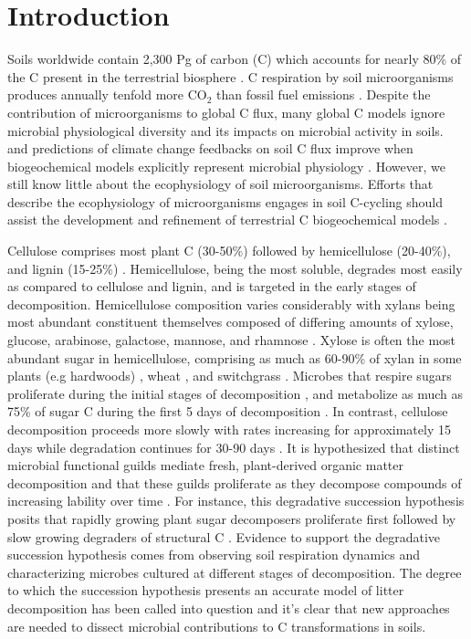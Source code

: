 \section{Introduction}
Soils worldwide contain 2,300 Pg of carbon (C) which accounts for nearly 80\%
of the C present in the terrestrial biosphere
\citep{Amundson_2001,BATJES_1996}. C respiration by soil microorganisms
produces annually tenfold more CO$_{2}$ than fossil fuel emissions
\citep{chapin2002principles}. Despite the contribution of microorganisms to
global C flux, many global C models ignore microbial
physiological diversity and its impacts on microbial activity in soils.
\citep{Allison2010,Six2006,Treseder2011} and predictions of climate change
feedbacks on soil C flux improve when biogeochemical models explicitly
represent microbial physiology \citep{Wieder2013}. However, we still know
little about the ecophysiology of soil microorganisms. Efforts that describe
the ecophysiology of microorganisms engages in soil C-cycling 
should assist the development and refinement of terrestrial
C biogeochemical models \citep{Bradford2008,Neff_2001,McGuire2010}.

Cellulose comprises most plant C (30-50\%) followed by hemicellulose (20-40\%),
and lignin (15-25\%) \citep{Lynd2002}. Hemicellulose, being the most soluble,
degrades most easily as compared to cellulose and lignin, and is targeted in
the early stages of decomposition. Hemicellulose composition varies
considerably with xylans being most abundant constituent themselves composed of
differing amounts of xylose, glucose, arabinose, galactose, mannose, and
rhamnose \citep{Saha2003}. Xylose is often the most abundant sugar in
hemicellulose, comprising as much as 60-90\% of xylan in some plants (e.g
hardwoods) \citep{Spiridon2008}, wheat \citep{Sun2005}, and switchgrass
\citep{Bunnell2013}. Microbes that respire sugars proliferate during the
initial stages of decomposition \citep{Garrett1951,Alexander1964}, and
metabolize as much as 75\% of sugar C during the first 5 days of decomposition
\citep{Engelking2007}. In contrast, cellulose decomposition proceeds more
slowly with rates increasing for approximately 15 days while degradation
continues for 30-90 days \citep{Hu1997,Engelking2007}. It is hypothesized that
distinct microbial functional guilds mediate fresh, plant-derived organic
matter decomposition and that these guilds proliferate as they decompose
compounds of increasing lability over time
\citep{Hu1997,Rui2009,AnneliseHKjoller2002,Bastian2009}. For instance, this
degradative succession hypothesis posits that rapidly growing plant sugar
decomposers proliferate first \citep{Garrett1963,Bremer1994} followed by slow
growing degraders of structural C \citep{Garrett1963}. Evidence to support the
degradative succession hypothesis comes from observing soil respiration
dynamics and characterizing microbes cultured at different stages of
decomposition. The degree to which the succession hypothesis presents an
accurate model of litter decomposition has been called into question
\citep{AnneliseHKjoller2002,Frankland1998,Osono_2005} and it's clear that new
approaches are needed to dissect microbial contributions to C transformations
in soils.

